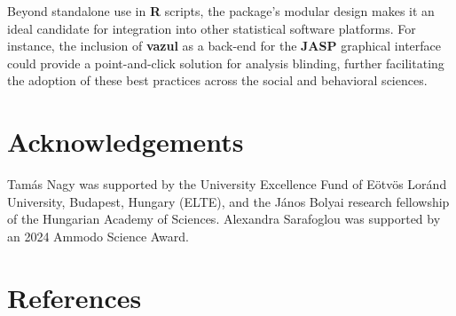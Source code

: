 Beyond standalone use in \textbf{R} scripts, the package's modular design makes it an ideal candidate for integration into other statistical software platforms. For instance, the inclusion of \textbf{vazul} as a back-end for the \textbf{JASP} \citep{JASP2025} graphical interface could provide a point-and-click solution for analysis blinding, further facilitating the adoption of these best practices across the social and behavioral sciences.

\section{Acknowledgements}\label{acknowledgements}

Tamás Nagy was supported by the University Excellence Fund of Eötvös Loránd University, Budapest, Hungary (ELTE), and the János Bolyai research fellowship of the Hungarian Academy of Sciences. Alexandra Sarafoglou was supported by an 2024 Ammodo Science Award.

\section{References}\label{references}



\address{%
Tamás Nagy\\
ELTE Eötvös Loránd University\\%
Institute of Psychology, ELTE Eötvös Loránd University\\ Budapest, Hungary\\
%
%
\textit{ORCiD: \href{https://orcid.org/0000-0001-5244-0356}{0000-0001-5244-0356}}\\%
\href{mailto:nagy.tamas@ppk.elte.hu}{\nolinkurl{nagy.tamas@ppk.elte.hu}}%
}

\address{%
Márton Kovács\\
Independent researcher\\%
Budapest, Hungary\\
%
%
\textit{ORCiD: \href{https://orcid.org/0000-0002-8142-8492}{0000-0002-8142-8492}}\\%
\href{mailto:marton.balazs.kovacs@gmail.com}{\nolinkurl{marton.balazs.kovacs@gmail.com}}%
}

\address{%
Alexandra Sarafoglou\\
University of Amsterdam\\%
Department of Psychology, University of Amsterdam\\ Amsterdam, The Netherlands\\
%
%
\textit{ORCiD: \href{https://orcid.org/0000-0003-0031-685X}{0000-0003-0031-685X}}\\%
\href{mailto:a.s.g.sarafoglou@uva.nl}{\nolinkurl{a.s.g.sarafoglou@uva.nl}}%
}
